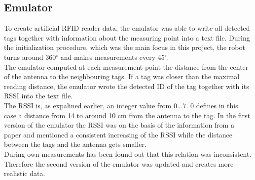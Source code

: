 \subsection{Emulator}
To create artificial RFID reader data, the emulator was able to write all detected tags together with information about the measuring point into a text file. During the initialization procedure, which was the main focus in this project, the robot turns around 360$^\circ$ and makes measurements every 45$^\circ$. \\
The emulator computed at each measurement point the distance from the center of the antenna to the neighbouring tags. If a tag was closer than the maximal reading distance, the emulator wrote the detected ID of the tag together with its RSSI into the text file. \\
The RSSI is, as expalined earlier, an integer value from 0...7. 0 defines in this case a distance from 14 to around 10 cm from the antenna to the tag. In the first version of the emulator the RSSI was on the basis of the information from a paper \cite{ChristofRohrigDanielHessandFrankKunemund.} and mentioned a consistent increasing of the RSSI while the distance between the tags and the antenna gets smaller. \\
During own measurements has been found out that this relation was inconsistent. Therefore the second version of the emulator was updated and creates more realistic data.\\

